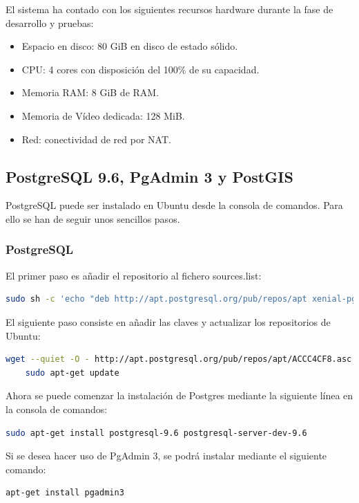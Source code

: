 El sistema ha contado con los siguientes recursos hardware durante la fase de desarrollo y pruebas:

\begin{itemize}
	\item Espacio en disco: 80 GiB en disco de estado sólido.
	\item CPU: 4 cores con disposición del 100\% de su capacidad.
	\item Memoria RAM: 8 GiB de RAM.
	\item Memoria de Vídeo dedicada: 128 MiB.
	\item Red: conectividad de red por NAT.
\end{itemize}


\subsection{PostgreSQL 9.6, PgAdmin 3 y PostGIS}
PostgreSQL puede ser instalado en Ubuntu desde la consola de comandos. Para ello se han de seguir unos sencillos pasos.

\subsubsection{PostgreSQL}

El primer paso es añadir el repositorio al fichero sources.list:

\begin{lstlisting}[language=bash]
  sudo sh -c 'echo "deb http://apt.postgresql.org/pub/repos/apt xenial-pgdg main" >> /etc/apt/sources.list'
\end{lstlisting}

El siguiente paso consiste en añadir las claves y actualizar los repositorios de Ubuntu:

\begin{lstlisting}[language=bash]
	wget --quiet -O - http://apt.postgresql.org/pub/repos/apt/ACCC4CF8.asc | sudo apt-key add -
	sudo apt-get update
\end{lstlisting}

Ahora se puede comenzar la instalación de Postgres mediante la siguiente línea en la consola de comandos:
\begin{lstlisting}[language=bash]
	sudo apt-get install postgresql-9.6 postgresql-server-dev-9.6
\end{lstlisting}

Si se desea hacer uso de PgAdmin 3, se podrá instalar mediante el siguiente comando:
\begin{lstlisting}[language=bash]
	apt-get install pgadmin3
\end{lstlisting}

